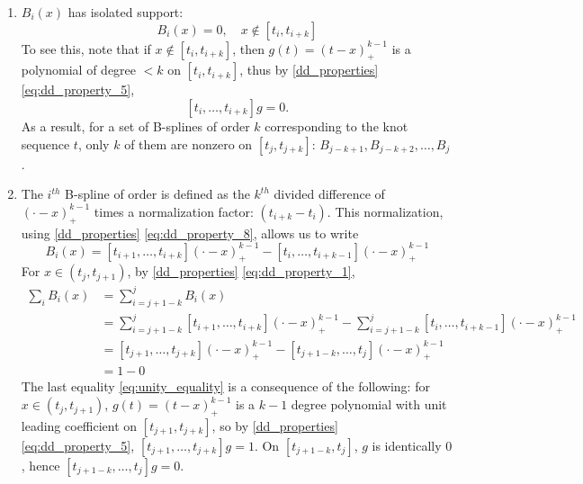 \documentclass[12pt]{article}
\theoremstyle{definition}
\begin{document}
\begin{enumerate}
\item $B_i\left(x\right)$ has isolated support:
\[
B_i\left(x\right) = 0, \quad x \not \in \left[t_{i},t_{i+k}\right]
\]
To see this, note that if $x \not \in \left[t_{i},t_{i+k}\right]$, then $g\left(t \right) = \left(t-x\right)^{k-1}_+$ is a polynomial of degree $< k$ on $\left[t_{i},t_{i+k}\right]$, thus by \ref{dd_properties} \ref{eq:dd_property_5},
\[
\left[t_{i},\dots,t_{i+k}\right]g = 0.
\]
As a result, for a set of B-splines of order $k$ corresponding to the knot sequence $t$, only $k$ of them are nonzero on $\left[t_{j},t_{j+k}\right]$: $B_{j-k+1},B_{j-k+2},\dots,B_{j}$.
\item The $i^{th}$ B-spline of order is defined as the $k^{th}$ divided difference of $\left(\cdot - x\right)_+^{k-1}$ times a normalization factor: $\left(t_{i+k}-t_i\right)$. This normalization, using \ref{dd_properties} \ref{eq:dd_property_8}, allows us to write 
\[
B_i\left(x\right)=\left[t_{i+1},\dots,t_{i+k} \right]\left(\cdot - x\right)_+^{k-1} - \left[t_{i},\dots,t_{i+k-1} \right]\left(\cdot - x\right)_+^{k-1}
\]
For $x \in \left(t_{j},t_{j+1}\right)$, by \ref{dd_properties} \ref{eq:dd_property_1},
\begin{align}
\sum_{i} B_i\left(x\right) &=  \sum_{i=j+1-k}^{j} B_i\left(x\right) \nonumber\\
&= \sum_{i=j+1-k}^{j} \left[t_{i+1},\dots,t_{i+k} \right] \left(\cdot - x\right)_+^{k-1} - \sum_{i=j+1-k}^{j} \left[t_{i},\dots,t_{i+k-1} \right] \left(\cdot - x\right)_+^{k-1} \nonumber \\
&= \left[t_{j+1},\dots,t_{j+k} \right] \left(\cdot - x\right)_+^{k-1} - \left[t_{j+1-k},\dots,t_{j} \right] \left(\cdot - x\right)_+^{k-1} \nonumber \\
&= 1 - 0 \label{eq:unity_equality}
\end{align}
The last equality \ref{eq:unity_equality} is a consequence of the following: for $x \in \left(t_j,t_{j+1}\right)$, $g\left(t\right)=\left(t - x\right)_+^{k-1}$ is a $k-1$ degree polynomial with unit leading coefficient on $\left[ t_{j+1},t_{j+k} \right]$, so by \ref{dd_properties} \ref{eq:dd_property_5}, $\left[ t_{j+1},\dots,t_{j+k} \right]g=1$. On $\left[ t_{j+1-k},t_{j} \right]$, $g$ is identically $0$, hence $\left[ t_{j+1-k},\dots,t_{j} \right]g = 0$.   
\end{enumerate}
\end{document}
